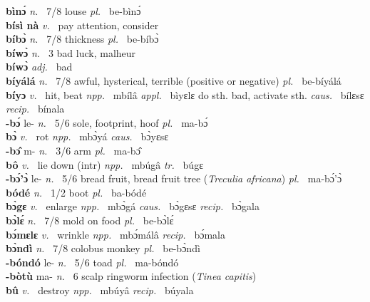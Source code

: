 {\bfseries bìnɔ́}  {\itshape n.~} 7/8 louse {\itshape pl.~} be-bìnɔ́    \\ 
{\bfseries bísì nà}  {\itshape v.~} pay attention, consider    \\ 
{\bfseries bíbɔ̀}  {\itshape n.~} 7/8 thickness {\itshape pl.~} be-bíbɔ̀    \\ 
{\bfseries bíwɔ̀}  {\itshape n.~} 3 bad luck, malheur    \\ 
{\bfseries bíwɔ̀}  {\itshape adj.~} bad    \\ 
{\bfseries bíyálá}  {\itshape n.~} 7/8 awful, hysterical, terrible (positive or negative) {\itshape pl.~} be-bíyálá    \\ 
{\bfseries bíyɔ}  {\itshape v.~} hit, beat   {\itshape npp.~} mbílâ {\itshape appl.~} bìyɛlɛ do sth. bad, activate sth. {\itshape caus.~} bílɛsɛ {\itshape recip.~} bínala  \\ 
{\bfseries -bɔ́} le- {\itshape n.~} 5/6 sole, footprint, hoof {\itshape pl.~} ma-bɔ́    \\ 
{\bfseries bɔ̀}  {\itshape v.~} rot   {\itshape npp.~} mbɔ̀yá {\itshape caus.~} bɔ̀yɛsɛ  \\ 
{\bfseries -bɔ̂} m- {\itshape n.~} 3/6 arm {\itshape pl.~} ma-bɔ̂    \\ 
{\bfseries bô}  {\itshape v.~} lie down (intr)   {\itshape npp.~} mbúgâ {\itshape tr.~} búgɛ  \\ 
{\bfseries -bɔ́'ɔ̀} le- {\itshape n.~} 5/6 bread fruit, bread fruit tree ({\itshape Treculia africana}) {\itshape pl.~} ma-bɔ́'ɔ̀    \\ 
{\bfseries bódé}  {\itshape n.~} 1/2 boot {\itshape pl.~} ba-bódé    \\ 
{\bfseries bɔ̀gɛ}  {\itshape v.~} enlarge   {\itshape npp.~} mbɔ̀gá {\itshape caus.~} bɔ̀gɛsɛ {\itshape recip.~} bɔ̀gala  \\ 
{\bfseries bɔ̀lɛ́}  {\itshape n.~} 7/8 mold on food {\itshape pl.~} be-bɔ̀lɛ́    \\ 
{\bfseries bɔ́mɛlɛ}  {\itshape v.~} wrinkle    {\itshape npp.~} mbɔ́málâ {\itshape recip.~} bɔ́mala  \\ 
{\bfseries bɔ̀ndì}  {\itshape n.~} 7/8 colobus monkey {\itshape pl.~} be-bɔ̀ndì    \\ 
{\bfseries -bóndó} le- {\itshape n.~} 5/6 toad {\itshape pl.~} ma-bóndó    \\ 
{\bfseries -bòtù} ma- {\itshape n.~} 6 scalp ringworm infection ({\itshape Tinea capitis})    \\ 
{\bfseries bû}  {\itshape v.~} destroy   {\itshape npp.~} mbúyâ {\itshape recip.~} búyala  \\ 
